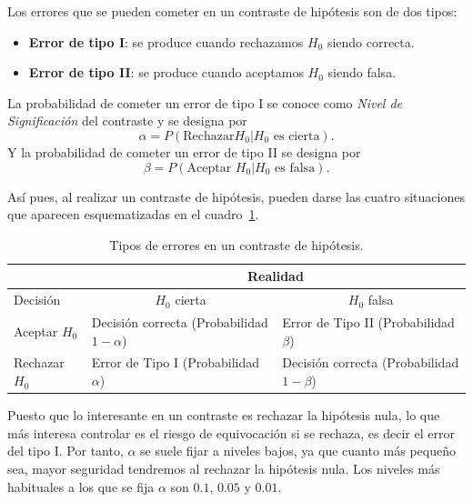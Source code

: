 Los errores que se pueden cometer en un contraste de hipótesis son de dos tipos:
\begin{itemize}
\item \textbf{Error de tipo I}: se produce cuando rechazamos $H_0$ siendo correcta.
\item \textbf{Error de tipo II}: se produce cuando aceptamos $H_0$ siendo falsa.
\end{itemize}

La probabilidad de cometer un error de tipo I se conoce como \emph{Nivel de
Significación} del contraste y se designa por 
\[ 
\alpha=P(\textrm{Rechazar}H_0|H_0\textrm{ es cierta}).
\] 
Y la probabilidad de cometer un error de tipo II se designa por 
\[
\beta=P(\textrm{Aceptar }H_0|H_0\textrm{ es falsa}).
\]

Así pues, al realizar un contraste de hipótesis, pueden darse las cuatro situaciones que aparecen esquematizadas en el
cuadro~\ref{t:errores}.

\begin{table}[h!]
\centering
\begin{tabular}{|m{2.5cm}|m{3.5cm}|m{3.5cm}|}
\cline{2-3}
\multicolumn{1}{l|}{} & \multicolumn{2}{c|}{Realidad} \\
\hline
Decisión & \multicolumn{1}{c|}{$H_0$ cierta} & \multicolumn{1}{c|}{$H_0$ falsa} \\
\hline
Aceptar $H_0$ & \multicolumn{1}{m{3.5cm}|}{\centering Decisión correcta \newline (Probabilidad $1-\alpha$) } &
\multicolumn{1}{m{3.5cm}|}{\centering Error de Tipo II \newline (Probabilidad $\beta$)} \\
\hline
Rechazar $H_0$ & \multicolumn{1}{m{3.5cm}|}{\centering Error de Tipo I \newline (Probabilidad $\alpha$)} & \multicolumn{1}{m{3.5cm}|}{\centering Decisión correcta \newline (Probabilidad $1-\beta$)} \\
\hline
\end{tabular}
\caption{Tipos de errores en un contraste de hipótesis.} \label{t:errores}
\end{table}

Puesto que lo interesante en un contraste es rechazar la hipótesis nula, lo que más interesa controlar es el riesgo de
equivocación si se rechaza, es decir el error del tipo I.
Por tanto, $\alpha$ se suele fijar a niveles bajos, ya que cuanto más pequeño sea, mayor seguridad tendremos al rechazar
la hipótesis nula.
Los niveles más habituales a los que se fija $\alpha$ son $0.1$, $0.05$ y $0.01$.

